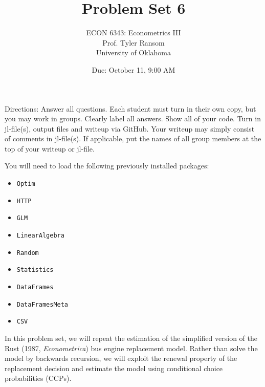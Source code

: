 \documentclass[12pt,english]{article}
\begin{document}
\title{Problem Set 6}
\author{ECON 6343: Econometrics III\\
Prof. Tyler Ransom\\
University of Oklahoma}
\date{Due: October 11, 9:00 AM}

\maketitle
Directions: Answer all questions. Each student must turn in their own copy, but you may work in groups. Clearly label all answers. Show all of your code. Turn in jl-file(s), output files and writeup via GitHub. Your writeup may simply consist of comments in jl-file(s). If applicable, put the names of all group members at the top of your writeup or jl-file.


You will need to load the following previously installed packages:
\begin{itemize}
    \item[~] \texttt{Optim} 
    \item[~] \texttt{HTTP} 
    \item[~] \texttt{GLM} 
    \item[~] \texttt{LinearAlgebra} 
    \item[~] \texttt{Random} 
    \item[~] \texttt{Statistics} 
    \item[~] \texttt{DataFrames} 
    \item[~] \texttt{DataFramesMeta} 
    \item[~] \texttt{CSV} 
\end{itemize}
\pagebreak
In this problem set, we will repeat the estimation of the simplified version of the Rust (1987, \textit{Econometrica}) bus engine replacement model. Rather than solve the model by backwards recursion, we will exploit the renewal property of the replacement decision and estimate the model using conditional choice probabilities (CCPs). 
\end{document}

